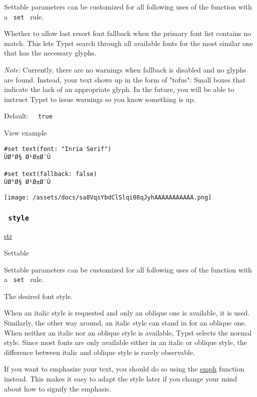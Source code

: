 \label{parameters-fallback-settable-tooltip}
Settable parameters can be customized for all following uses of the
function with a \texttt{\ set\ } rule.

Whether to allow last resort font fallback when the primary font list
contains no match. This lets Typst search through all available fonts
for the most similar one that has the necessary glyphs.

\emph{Note:} Currently, there are no warnings when fallback is disabled
and no glyphs are found. Instead, your text shows up in the form of
"tofus": Small boxes that indicate the lack of an appropriate glyph. In
the future, you will be able to instruct Typst to issue warnings so you
know something is up.

Default: \texttt{\ }{\texttt{\ true\ }}\texttt{\ }


View example

\begin{verbatim}
#set text(font: "Inria Serif")
ÙØ°Ø§ Ø¹Ø±Ø¨Ù

#set text(fallback: false)
ÙØ°Ø§ Ø¹Ø±Ø¨Ù
\end{verbatim}

\texttt{[image: /assets/docs/sa8VqsYbdClSlqi08qJyhAAAAAAAAAAA.png]}

\subsubsection{\texorpdfstring{\texttt{\ style\ }}{ style }}\label{parameters-style}

\href{/docs/reference/foundations/str/}{str}

{{ Settable }}

\label{parameters-style-settable-tooltip}
Settable parameters can be customized for all following uses of the
function with a \texttt{\ set\ } rule.

The desired font style.

When an italic style is requested and only an oblique one is available,
it is used. Similarly, the other way around, an italic style can stand
in for an oblique one. When neither an italic nor an oblique style is
available, Typst selects the normal style. Since most fonts are only
available either in an italic or oblique style, the difference between
italic and oblique style is rarely observable.

If you want to emphasize your text, you should do so using the
\href{/docs/reference/model/emph/}{emph} function instead. This makes it
easy to adapt the style later if you change your mind about how to
signify the emphasis.

